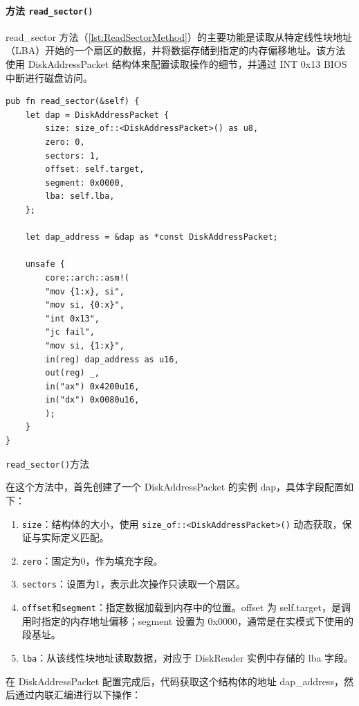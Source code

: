 \paragraph{方法 \texttt{read\_sector()}}

read\_sector 方法（\cref{lst:ReadSectorMethod}）的主要功能是读取从特定线性块地址（LBA）开始的一个扇区的数据，并将数据存储到指定的内存偏移地址。该方法使用 DiskAddressPacket 结构体来配置读取操作的细节，并通过 INT 0x13 BIOS 中断进行磁盘访问。

\begin{listing}[htbp]
    \begin{verbatim}
pub fn read_sector(&self) {
    let dap = DiskAddressPacket {
        size: size_of::<DiskAddressPacket>() as u8,
        zero: 0,
        sectors: 1,
        offset: self.target,
        segment: 0x0000,
        lba: self.lba,
    };

    let dap_address = &dap as *const DiskAddressPacket;

    unsafe {
        core::arch::asm!(
        "mov {1:x}, si",
        "mov si, {0:x}",
        "int 0x13",
        "jc fail",
        "mov si, {1:x}",
        in(reg) dap_address as u16,
        out(reg) _,
        in("ax") 0x4200u16,
        in("dx") 0x0080u16,
        );
    }
}
    \end{verbatim}
    \caption{\texttt{read\_sector()}方法}\label{lst:ReadSectorMethod}
\end{listing}

在这个方法中，首先创建了一个 DiskAddressPacket 的实例 dap，具体字段配置如下：

\begin{enumerate}
    \item \texttt{size}：结构体的大小，使用 \texttt{size\_of::<DiskAddressPacket>()} 动态获取，保证与实际定义匹配。
    \item \texttt{zero}：固定为0，作为填充字段。
    \item \texttt{sectors}：设置为1，表示此次操作只读取一个扇区。
    \item \texttt{offset}和\texttt{segment}：指定数据加载到内存中的位置。offset 为 self.target，是调用时指定的内存地址偏移；segment 设置为 0x0000，通常是在实模式下使用的段基址。
    \item \texttt{lba}：从该线性块地址读取数据，对应于 DiskReader 实例中存储的 lba 字段。
\end{enumerate}

在 DiskAddressPacket 配置完成后，代码获取这个结构体的地址 dap\_address，然后通过内联汇编进行以下操作：


